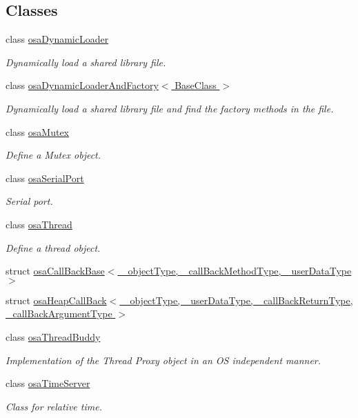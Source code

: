 \subsection*{Classes}
\begin{DoxyCompactItemize}
\item 
class \hyperlink{classosa_dynamic_loader}{osa\-Dynamic\-Loader}
\begin{DoxyCompactList}\small\item\em Dynamically load a shared library file. \end{DoxyCompactList}\item 
class \hyperlink{classosa_dynamic_loader_and_factory}{osa\-Dynamic\-Loader\-And\-Factory$<$ Base\-Class $>$}
\begin{DoxyCompactList}\small\item\em Dynamically load a shared library file and find the factory methods in the file. \end{DoxyCompactList}\item 
class \hyperlink{classosa_mutex}{osa\-Mutex}
\begin{DoxyCompactList}\small\item\em Define a Mutex object. \end{DoxyCompactList}\item 
class \hyperlink{classosa_serial_port}{osa\-Serial\-Port}
\begin{DoxyCompactList}\small\item\em Serial port. \end{DoxyCompactList}\item 
class \hyperlink{classosa_thread}{osa\-Thread}
\begin{DoxyCompactList}\small\item\em Define a thread object. \end{DoxyCompactList}\item 
struct \hyperlink{structosa_call_back_base}{osa\-Call\-Back\-Base$<$ \-\_\-object\-Type, \-\_\-call\-Back\-Method\-Type, \-\_\-user\-Data\-Type $>$}
\item 
struct \hyperlink{structosa_heap_call_back}{osa\-Heap\-Call\-Back$<$ \-\_\-object\-Type, \-\_\-user\-Data\-Type, \-\_\-call\-Back\-Return\-Type, \-\_\-call\-Back\-Argument\-Type $>$}
\item 
class \hyperlink{classosa_thread_buddy}{osa\-Thread\-Buddy}
\begin{DoxyCompactList}\small\item\em Implementation of the Thread Proxy object in an O\-S independent manner. \end{DoxyCompactList}\item 
class \hyperlink{classosa_time_server}{osa\-Time\-Server}
\begin{DoxyCompactList}\small\item\em Class for relative time. \end{DoxyCompactList}\end{DoxyCompactItemize}
